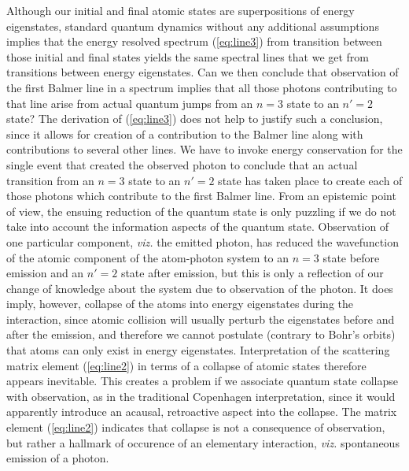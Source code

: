 \documentclass[final,3p,times,twocolumn]{elsarticle3}
\begin{document}
Although our initial and final atomic states are superpositions of
energy eigenstates, standard quantum dynamics without any additional
assumptions implies that the energy resolved spectrum (\ref{eq:line3}) from 
transition between those initial and final states yields the same  
spectral lines that we get from transitions between energy eigenstates.
Can we then conclude that observation of the first Balmer line in a spectrum 
implies that all those photons contributing to that line arise from
actual quantum jumps from an $n=3$ state to an $n'=2$ state?
The derivation of (\ref{eq:line3}) does not help to justify such a
conclusion, since it allows for creation of a contribution to the
Balmer line along with contributions to several other lines. 
We have to invoke energy conservation for the single event that
created the observed photon to conclude that an actual
transition from an $n=3$ state to an $n'=2$ state has taken place to create
each of those photons which contribute to the first Balmer line. From an
epistemic point of view, the ensuing reduction of the quantum state 
is only puzzling if we do not take into account the information aspects of the 
quantum state. Observation of one particular component, {\it viz.} the emitted 
photon, has reduced the wavefunction of the atomic component of the atom-photon 
system to an $n=3$ state before emission and an $n'=2$ state after emission, but 
this is only a reflection of our change of knowledge about the system due to
observation of the photon. It does imply, however, collapse of the atoms into 
energy eigenstates during the interaction, since atomic collision will usually 
perturb the eigenstates before and after the emission, and therefore we cannot 
postulate (contrary to Bohr's orbits) that atoms can only exist in energy eigenstates.
Interpretation of the scattering matrix element (\ref{eq:line2}) in terms
of a collapse of atomic states therefore appears inevitable.
This creates a problem if we associate quantum state collapse with observation, 
as in the traditional Copenhagen interpretation, since it would apparently 
introduce an acausal, retroactive aspect into the collapse. The 
matrix element (\ref{eq:line2}) indicates that collapse is not
a consequence of observation, but rather a hallmark of occurence of
an elementary interaction, {\it viz.} spontaneous emission of a photon.
\end{document}

